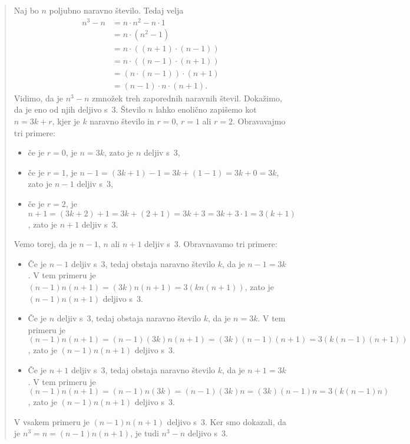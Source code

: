 \begin{quote}
  \begin{dokaz}
    Naj bo $n$ poljubno naravno število. Tedaj velja
    \begin{align*}
      n^3 - n
      &= n \cdot n^2 - n \cdot 1 \\
      &= n \cdot (n^2 - 1) \\
      &= n \cdot ((n + 1) \cdot (n - 1)) \\
      &= n \cdot ((n - 1) \cdot (n + 1)) \\
      &= (n \cdot (n - 1)) \cdot (n + 1) \\
      &= (n - 1) \cdot n \cdot (n + 1).
    \end{align*}
    Vidimo, da je $n^3 - n$ zmnožek treh zaporednih naravnih števil.
    Dokažimo, da je eno od njih deljivo s~$3$. Število $n$ lahko
    enolično zapišemo kot $n = 3 k + r$, kjer je $k$ naravno število
    in $r = 0$, $r = 1$ ali $r = 2$. Obravavajmo tri primere:
    \begin{itemize}
    \item če je $r = 0$, je $n = 3 k$, zato je $n$ deljiv s~$3$,
    \item če je $r = 1$, je $n - 1 = (3 k + 1) - 1 = 3 k + (1 - 1) = 3
      k + 0 = 3 k$, zato je $n-1$ deljiv s~$3$,
    \item če je $r = 2$, je $n + 1 = (3 k + 2) + 1 = 3 k + (2 + 1) = 3
      k + 3 = 3 k + 3 \cdot 1 = 3 (k +1)$, zato je $n+1$ deljiv s~$3$.
    \end{itemize}
    Vemo torej, da je $n - 1$, $n$ ali $n + 1$ deljiv s~$3$.
    Obravnavamo tri primere:
    \begin{itemize}
    \item Če je $n - 1$ deljiv s~$3$, tedaj  obstaja naravno število
      $k$, da je $n - 1 = 3 k$. V tem primeru je $(n - 1) n (n + 1) =
      (3 k) n (n + 1) = 3 (k n (n + 1))$, zato je $(n - 1) n (n + 1)$
      deljivo s~$3$.
    \item Če je $n$ deljiv s~$3$, tedaj obstaja naravno število $k$,
      da je $n = 3 k$. V tem primeru je $(n - 1) n (n + 1) = (n - 1)
      (3 k) n (n + 1) = (3 k) (n - 1) (n + 1) = 3 (k (n - 1) (n +
      1))$, zato je $(n - 1) n (n + 1)$ deljivo s~$3$.
    \item Če je $n + 1$ deljiv s~$3$, tedaj obstaja naravno število
      $k$, da je $n + 1 = 3 k$. V tem primeru je $(n - 1) n (n + 1) =
      (n - 1) n (3 k) = (n - 1) (3 k) n = (3 k) (n - 1) n = 3 (k (n -
      1) n)$, zato je $(n - 1) n (n + 1)$ deljivo s~$3$.
    \end{itemize}
    V vsakem primeru je $(n - 1) n (n + 1)$ deljivo s~$3$. Ker smo
    dokazali, da je $n^3 = n = (n - 1) n (n + 1)$, je tudi $n^3 - n$
    deljivo s~$3$.
  \end{dokaz}
\end{quote}

